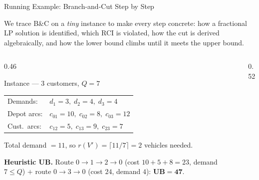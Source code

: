 \documentclass[aspectratio=169,10pt]{beamer}
\begin{document}
\begin{frame}[allowframebreaks]{Running Example: Branch-and-Cut Step by Step}

  We trace B\&C on a \emph{tiny} instance to make every step concrete:
  how a fractional LP solution is identified, which RCI is violated,
  how the cut is derived algebraically, and how the lower bound climbs
  until it meets the upper bound.

  \begin{columns}
    \begin{column}{0.46\textwidth}
      \begin{block}{Instance — 3 customers, $Q=7$}
        \begin{tabular}{@{}ll@{}}
          Demands: & $d_1=3,\;d_2=4,\;d_3=4$ \\[2pt]
          Depot arcs: & $c_{01}=10,\;c_{02}=8,\;c_{03}=12$ \\[2pt]
          Cust.\ arcs: & $c_{12}=5,\;c_{13}=9,\;c_{23}=7$
        \end{tabular}

        \medskip
        Total demand $=11$, so $r(V')=\lceil 11/7\rceil=2$ vehicles needed.

        \smallskip
        \textbf{Heuristic UB.} Route $0\!\to\!1\!\to\!2\!\to\!0$
        (cost $10+5+8=23$, demand $7\leq Q$) $+$ route $0\!\to\!3\!\to\!0$
        (cost $24$, demand $4$): $\boldsymbol{UB=47}$.
      \end{block}
    \end{column}
    \begin{column}{0.52\textwidth}
      \begin{center}
      \end{center}
    \end{column}
  \end{columns}


\end{frame}
\end{document}
